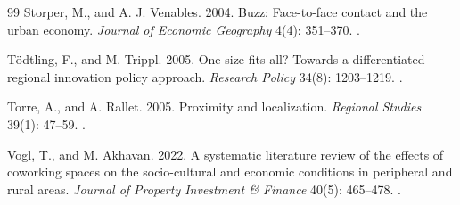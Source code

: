 \begin{thebibliography}{99}
Storper, M., and A. J. Venables. 2004. Buzz: Face-to-face contact and the urban economy. \emph{Journal of Economic Geography} 4(4): 351--370. .

T{\"o}dtling, F., and M. Trippl. 2005. One size fits all? Towards a differentiated regional innovation policy approach. \emph{Research Policy} 34(8): 1203--1219. .

Torre, A., and A. Rallet. 2005. Proximity and localization. \emph{Regional Studies} 39(1): 47--59. .

Vogl, T., and M. Akhavan. 2022. A systematic literature review of the effects of coworking spaces on the socio-cultural and economic conditions in peripheral and rural areas. \emph{Journal of Property Investment \& Finance} 40(5): 465--478. .

\end{thebibliography}

